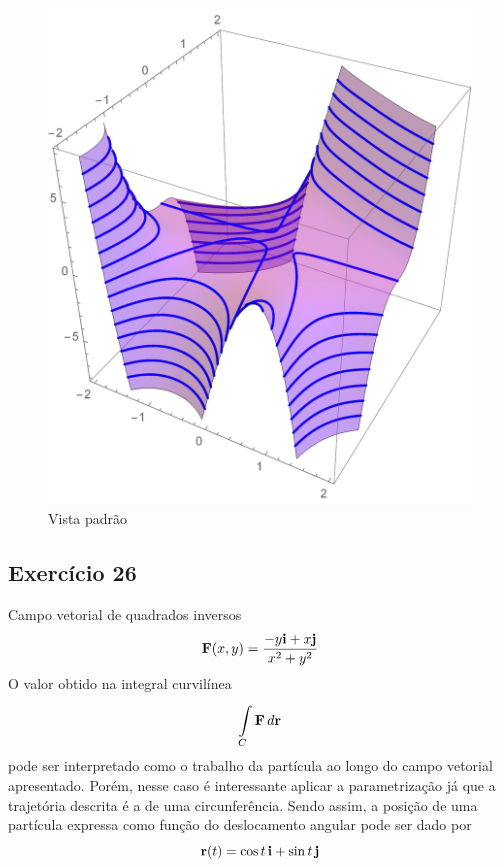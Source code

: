 \documentclass[a4paper, 12pt, brazilian]{article}
\begin{document}
	\begin{figure}[H]
		\centering
		\includegraphics[width=0.6\linewidth]{images/g153d2}
		\caption{Vista padrão}
	\end{figure}
	
	\subsection{Exercício 26}
	\noindent Campo vetorial de quadrados inversos
	\begin{equation}
		\textbf{F} (x,y)=\dfrac{-y\textbf{i}+x\textbf{j}}{x^{2}+y^{2}}
	\end{equation}
	O valor obtido na integral curvilínea 
	\begin{equation}
		\int\limits_{C}^{}\textbf{F}\,d\textbf{r}
	\end{equation}
	pode ser interpretado como o trabalho da partícula ao longo do campo vetorial apresentado. Porém, nesse caso é interessante aplicar a parametrização já que a trajetória descrita é a de uma circunferência. Sendo assim, a posição de uma partícula expressa como função do deslocamento angular pode ser dado por
	\begin{equation}
		\textbf{r}(t)=\cos t\,\textbf{i}+\sin t\,\textbf{j}
	\end{equation}
	
\end{document}
